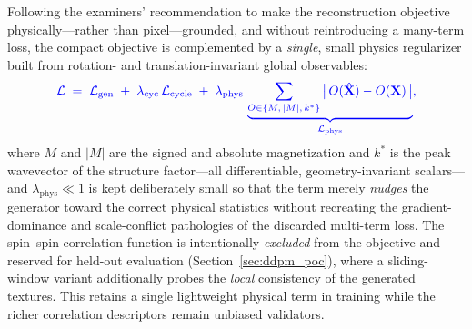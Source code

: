 \documentclass[letterpaper, 12, one column]{article}
\newcommand{\jc}[1]{\textcolor[rgb]{0.00,0.0,1.00}{#1}}
\begin{document}
\jc{Following the examiners' recommendation to make the reconstruction objective physically---rather than pixel---grounded, and without reintroducing a many-term loss, the compact objective is complemented by a \emph{single}, small physics regularizer built from rotation- and translation-invariant global observables:}
\begin{equation}\label{eq:phys_reg}
\jc{\mathcal{L} \;=\; \mathcal{L}_{\mathrm{gen}} \;+\; \lambda_{\mathrm{cyc}}\,\mathcal{L}_{\mathrm{cycle}} \;+\; \lambda_{\mathrm{phys}}\,\underbrace{\sum_{O\in\{M,\,|M|,\,k^{\ast}\}} \big\lvert\, O(\hat{\mathbf{X}}) - O(\mathbf{X})\,\big\rvert}_{\mathcal{L}_{\mathrm{phys}}},}
\end{equation}
\jc{where $M$ and $|M|$ are the signed and absolute magnetization and $k^{\ast}$ is the peak wavevector of the structure factor---all differentiable, geometry-invariant scalars---and $\lambda_{\mathrm{phys}}\!\ll\!1$ is kept deliberately small so that the term merely \emph{nudges} the generator toward the correct physical statistics without recreating the gradient-dominance and scale-conflict pathologies of the discarded multi-term loss. The spin--spin correlation function is intentionally \emph{excluded} from the objective and reserved for held-out evaluation (Section~\ref{sec:ddpm_poc}), where a sliding-window variant additionally probes the \emph{local} consistency of the generated textures. This retains a single lightweight physical term in training while the richer correlation descriptors remain unbiased validators.}
\end{document}
